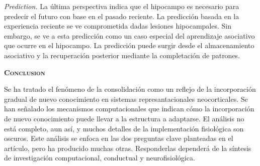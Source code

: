 \documentclass[a4paper,12pt]{article}
\begin{document}
{\itshape Prediction.} La última perspectiva indica que el hipocampo es necesario para predecir el futuro con base en el pasado reciente. La predicción basada en la experiencia reciente se ve comprometida dadas lesiones hipocampales. Sin embargo, se ve a esta predicción como un caso especial del aprendizaje asociativo que ocurre en el hipocampo. La predicción puede surgir desde el almacenamiento asociativo y la recuperación posterior mediante la completación de patrones. 

{\scshape\bfseries Conclusion}

Se ha tratado el fenómeno de la consolidación como un reflejo de la incorporación gradual de nuevo conocimiento en sistemas represantacionales neocorticales. Se han señalado los mecanismos computacionales que indican cómo la incorporación de nuevo conocimiento puede llevar a la estructura a adaptarse. El análisis no está completo, aun así, y muchos detalles de la implementación fisiológica son oscuros. Este análisis se enfoca en las dos preguntas clave planteadas en el artículo, pero ha producido muchas otras. Responderlas dependerá de la síntesis de investigación computacional, conductual y neurofisiológica.

 
\end{document}
